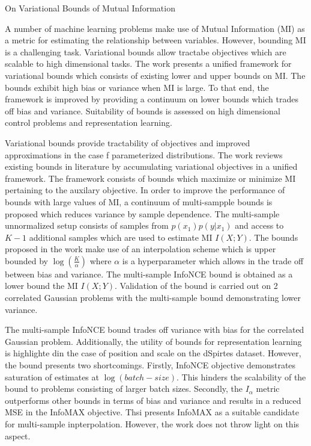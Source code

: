 \documentclass[11pt,letterpaper]{article}
\begin{document}
\begin{center}
  \large{On Variational Bounds of Mutual Information}
\end{center}



A number of machine learning problems make use of Mutual Information (MI) as a metric for estimating the relationship between variables. However, bounding MI is a challenging task. Variational bounds allow tractabe objectives which are scalable to high dimensional tasks. The work presents a unified framework for variational bounds which consists of existing lower and upper bounds on MI. The bounds exhibit high bias or variance when MI is large. To that end, the framework is improved by providing a continuum on lower bounds which trades off bias and variance. Suitability of bounds is assessed on high dimensional control problems and representation learning. 

Variational bounds provide tractability of objectives and improved approximations in the case f parameterized distributions. The work reviews existing bounds in literature by accumulating variational objectives in a unified framework. The framework consists of bounds which maximize or minimize MI pertaining to the auxilary objective. In order to improve the performance of bounds with large values of MI, a continuum of multi-sampple bounds is proposed which reduces variance by sample dependence. The multi-sample unnormalized setup consists of samples from $p(x_{1})p(y|x_{1})$ and access to $K-1$ additional samples which are used to estimate MI $I(X;Y)$. The bounds proposed in the work make use of an interpolation scheme which is upper bounded by $\log(\frac{K}{\alpha})$ where $\alpha$ is a hyperparameter which allows in the trade off between bias and variance. The multi-sample InfoNCE bound is obtained as a lower bound the MI $I(X;Y)$. Validation of the bound is carried out on 2 correlated Gaussian problems with the multi-sample bound demonstrating lower variance.

The multi-sample InfoNCE bound trades off variance with bias for the correlated Gaussian problem. Additionally, the utility of bounds for representation learning is highlighte din the case of position and scale on the dSpirtes dataset. However, the bound presents two shortcomings. Firstly, InfoNCE objective demonstrates saturation of estimates at $\log(batch-size)$. This hinders the scalability of the bound to problems consisting of larger batch sizes. Secondly, the $I_{\alpha}$ metric outperforms other bounds in terms of bias and variance and results in a reduced MSE in the InfoMAX objective. Thsi presents InfoMAX as a suitable candidate for multi-sample inpterpolation. However, the work does not throw light on this aspect. 
\end{document}
